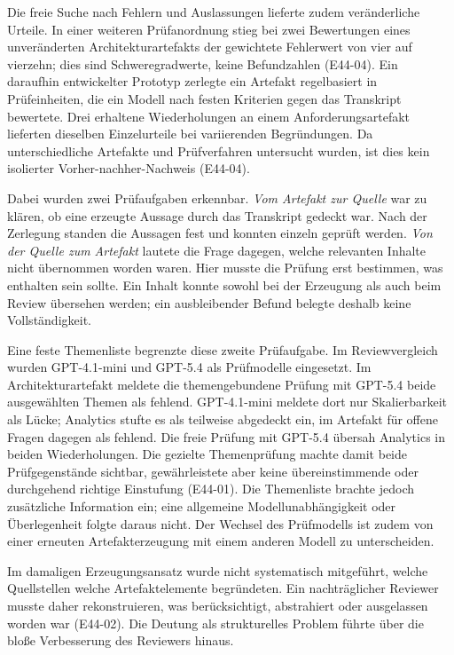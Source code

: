Die freie Suche nach Fehlern und Auslassungen lieferte zudem
veränderliche Urteile. In einer weiteren Prüfanordnung stieg bei
zwei Bewertungen eines unveränderten Architekturartefakts der
gewichtete Fehlerwert von vier auf vierzehn; dies sind
Schweregradwerte, keine Befundzahlen (E44-04).
Ein daraufhin entwickelter Prototyp zerlegte ein Artefakt regelbasiert
in Prüfeinheiten, die ein Modell nach festen Kriterien gegen das
Transkript bewertete. Drei erhaltene Wiederholungen an einem
Anforderungsartefakt lieferten dieselben Einzelurteile bei
variierenden Begründungen. Da unterschiedliche Artefakte und
Prüfverfahren untersucht wurden, ist dies kein isolierter
Vorher-nachher-Nachweis (E44-04).

Dabei wurden zwei Prüfaufgaben erkennbar. \emph{Vom Artefakt zur
Quelle} war zu klären, ob eine erzeugte Aussage durch das Transkript
gedeckt war. Nach der Zerlegung standen die Aussagen fest und
konnten einzeln geprüft werden. \emph{Von der Quelle zum Artefakt}
lautete die Frage dagegen, welche relevanten Inhalte nicht übernommen
worden waren. Hier musste die Prüfung erst bestimmen, was enthalten
sein sollte. Ein Inhalt konnte sowohl bei der Erzeugung als auch
beim Review übersehen werden; ein ausbleibender Befund belegte
deshalb keine Vollständigkeit.

Eine feste Themenliste begrenzte diese zweite Prüfaufgabe. Im
Reviewvergleich wurden GPT-4.1-mini und GPT-5.4 als Prüfmodelle
eingesetzt. Im Architekturartefakt meldete die themengebundene
Prüfung mit GPT-5.4 beide ausgewählten Themen als fehlend.
GPT-4.1-mini meldete dort nur Skalierbarkeit als Lücke; Analytics
stufte es als teilweise abgedeckt ein, im Artefakt für offene Fragen
dagegen als fehlend. Die freie Prüfung mit GPT-5.4 übersah Analytics
in beiden Wiederholungen. Die gezielte Themenprüfung machte damit
beide Prüfgegenstände sichtbar, gewährleistete aber keine
übereinstimmende oder durchgehend richtige Einstufung (E44-01). Die Themenliste brachte jedoch
zusätzliche Information ein; eine allgemeine Modellunabhängigkeit
oder Überlegenheit folgte daraus nicht. Der Wechsel des Prüfmodells
ist zudem von einer erneuten Artefakterzeugung mit einem anderen
Modell zu unterscheiden.

Im damaligen Erzeugungsansatz wurde nicht systematisch mitgeführt,
welche Quellstellen welche Artefaktelemente begründeten. Ein
nachträglicher Reviewer musste daher rekonstruieren, was
berücksichtigt, abstrahiert oder ausgelassen worden war (E44-02).
Die Deutung als strukturelles Problem führte über die bloße
Verbesserung des Reviewers hinaus.

